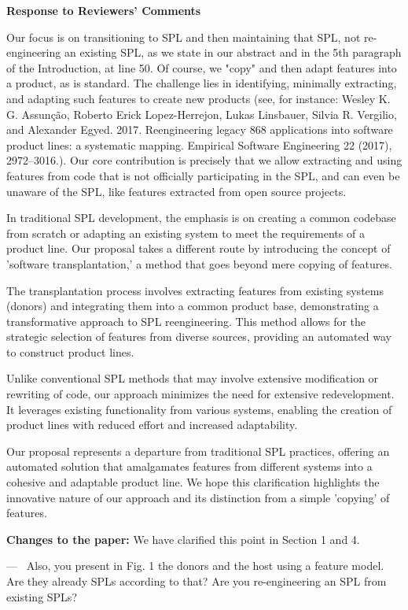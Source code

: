 \documentclass[a4paper,11pt]{letter}
\newcounter{reviewer}
\newcounter{point}[reviewer]
\renewcommand{\thepoint}{P\,\thereviewer.\arabic{point}}
\newenvironment{point}
   {\refstepcounter{point} \bigskip \noindent {\textbf{Reviewer~Point~\thepoint} } ---\ }
   {\par }
\newcommand{\changes}[1]{\textbf{Changes to the paper:} \begingroup\color{blue}#1\endgroup}
\begin{document}
\begin{letter}{\textbf{Response to Reviewers' Comments}}
{Our focus is on transitioning to SPL and then maintaining that SPL, not re-engineering an existing SPL, as we state in our abstract and in the 5th paragraph of the Introduction, at line 50.  
Of course, we "copy" and then adapt features into a product, as is standard. 
The challenge lies in identifying, minimally extracting, and adapting such features to create new products (see, for instance: Wesley K. G. Assunção, Roberto Erick Lopez-Herrejon, Lukas Linsbauer, Silvia R. Vergilio, and Alexander Egyed. 2017. Reengineering legacy 868 applications into software product lines: a systematic mapping. Empirical Software Engineering 22 (2017), 2972–3016.). 
Our core contribution is precisely that we allow extracting and using features from code 
that is not officially participating in the SPL, and can even be unaware of the SPL, like 
features extracted from open source projects.

In traditional SPL development, the emphasis is on creating a common codebase from scratch or adapting an existing system to meet the requirements of a product line. Our proposal takes a different route by introducing the concept of 'software transplantation,' a method that goes beyond mere copying of features.

The transplantation process involves extracting features from existing systems (donors) and integrating them into a common product base, demonstrating a transformative approach to SPL reengineering. This method allows for the strategic selection of features from diverse sources, providing an automated way to construct product lines.

Unlike conventional SPL methods that may involve extensive modification or rewriting of code, our approach minimizes the need for extensive redevelopment. It leverages existing functionality from various systems, enabling the creation of product lines with reduced effort and increased adaptability.

Our proposal represents a departure from traditional SPL practices, offering an automated solution that amalgamates features from different systems into a cohesive and adaptable product line. We hope this clarification highlights the innovative nature of our approach and its distinction from a simple 'copying' of features.}

\changes{We have clarified this point in Section 1 and 4.}

\begin{point} 
Also, you present in Fig. 1 the donors and the  host using a feature model. Are they already SPLs according to that? Are you re-engineering an SPL from existing SPLs? 
\end{point}


\end{letter}
\end{document}
